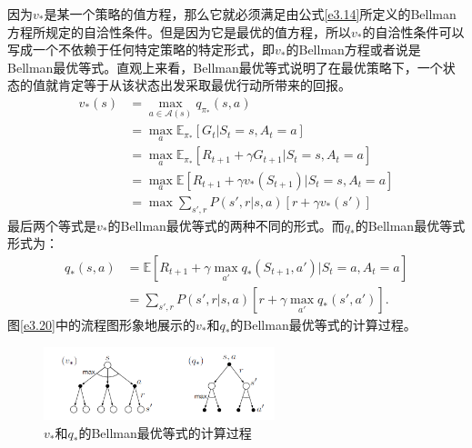 \documentclass{ctexart}
\begin{document}
            因为$v_*$是某一个策略的值方程，那么它就必须满足由公式\ref{e3.14}所定义的Bellman方程所规定的自洽性条件。但是因为它是最优的值方程，所以$v_*$的自洽性条件可以写成一个不依赖于任何特定策略的特定形式，即$v_*$的Bellman方程或者说是Bellman最优等式。直观上来看，Bellman最优等式说明了在最优策略下，一个状态的值就肯定等于从该状态出发采取最优行动所带来的回报。
            \begin{equation}
                \begin{split}
                    v_*(s) &= \operatorname*{max}\limits_{a\in \mathcal{A}(s)} q_{\pi_*}(s,a) \\
                           &= \operatorname*{max}\limits_{a} \mathbb{E}_{\pi_*}[G_t|S_t=s,A_t=a] \\
                           &= \operatorname*{max}\limits_{a} \mathbb{E}_{\pi_*}[R_{t+1} + \gamma G_{t+1}|S_t=s,A_t=a] \\
                           &= \operatorname*{max}\limits_{a} \mathbb{E}[R_{t+1} + \gamma v_*(S_{t+1})|S_t=s,A_t=a] \\
                           &= \operatorname*{max} \sum_{s',r} P(s',r|s,a) [r + \gamma v_*(s')]
                \end{split}
            \end{equation}
            最后两个等式是$v_*$的Bellman最优等式的两种不同的形式。而$q_*$的Bellman最优等式形式为：
            \begin{equation}
                \begin{split}
                    q_*(s,a) &= \mathbb{E} [R_{t+1}+\gamma \operatorname*{max}\limits_{a'}q_*(S_{t+1},a')|S_t=a,A_t=a] \\
                             &= \sum_{s',r} P(s',r| s,a)[r + \gamma \operatorname*{max}\limits_{a'} q_*(s',a')].
                \end{split}
                \label{e3.20}
            \end{equation}
            图\ref{e3.20}中的流程图形象地展示的$v_*$和$q_*$的Bellman最优等式的计算过程。
            \begin{figure}[h]
                \centering
                \includegraphics[width=0.6\textwidth]{f3-4}
                \caption{$v_*$和$q_*$的Bellman最优等式的计算过程}
                \label{f3_4}
            \end{figure}
\end{document}
